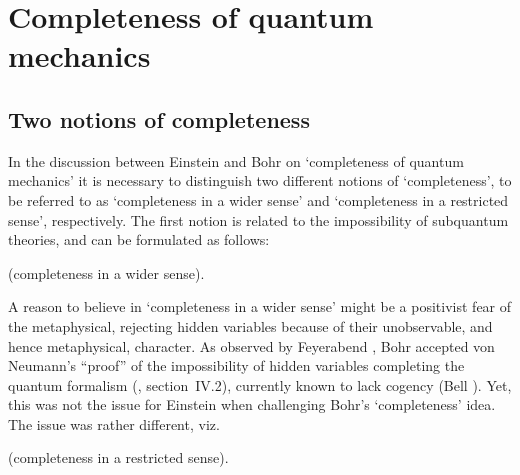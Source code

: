 \documentclass[12pt]{article}
\begin{document}
\section{Completeness of quantum mechanics}\label{sec2.1}
\subsection{Two notions of completeness}\label{sec2.1.1}
In the discussion between Einstein and Bohr on `completeness of
quantum mechanics' it is necessary to distinguish two different
notions of `completeness', to be referred to as `completeness in a
wider sense' and `completeness in a restricted sense',
respectively. The first notion is related to the impossibility of
subquantum theories, and can be formulated as follows:

 (completeness in a wider sense).

A reason to believe in `completeness in a wider sense' might be a
positivist fear of the metaphysical, rejecting hidden variables
because of their unobservable, and hence metaphysical, character.
As observed by Feyerabend \cite{Feyerabend68}, Bohr accepted von
Neumann's ``proof'' of the impossibility of hidden variables
completing the quantum formalism (\cite{vN32}, section~IV.2),
currently known to lack cogency (Bell \cite{Bell66}). Yet, this
was not the issue for Einstein when challenging Bohr's
`completeness' idea. The issue was rather different, viz.

(completeness in a restricted sense).
\end{document}
